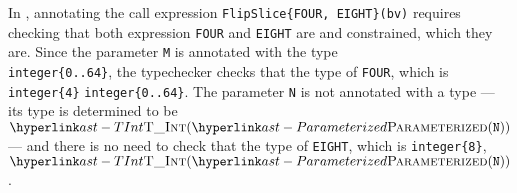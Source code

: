 In ,
annotating the call expression \verb|FlipSlice{FOUR, EIGHT}(bv)|
requires checking that both expression \verb|FOUR| and \verb|EIGHT| are \symbolicallyevaluable{}
and constrained, which they are.
Since the parameter \verb|M| is annotated with the type \\
\verb|integer{0..64}|,
the typechecker checks that the type of \verb|FOUR|, which is \verb|integer{4}| \typesatisfies{}
\verb|integer{0..64}|.
The parameter \verb|N| is not annotated with a type --- its type is
determined to be \\
$\TInt(\Parameterized(\texttt{N}))$ --- and there is no need to check that
the type of \verb|EIGHT|, which is \verb|integer{8}|, \typesatisfies{} $\TInt(\Parameterized(\texttt{N}))$.


